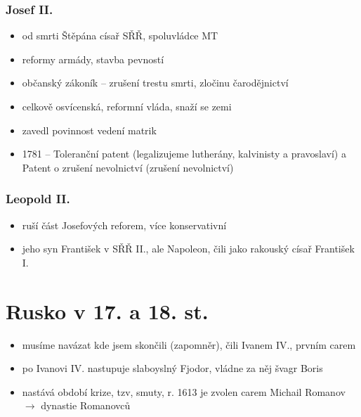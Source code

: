 \documentclass{article}
\begin{document}
\section{Josef II.}
\begin{itemize}
  \item od smrti Štěpána císař SŘŘ, spoluvládce MT
  \item reformy armády, stavba pevností
  \item občanský zákoník -- zrušení trestu smrti, zločinu čarodějnictví
  \item celkově osvícenská, reformní vláda, snaží se zemi 
  \item zavedl povinnost vedení matrik
  \item 1781 -- Toleranční patent (legalizujeme lutherány, kalvinisty a pravoslaví) a Patent o zrušení nevolnictví (zrušení nevolnictví)
\end{itemize}

\section{Leopold II.}
\begin{itemize}
  \item ruší část Josefových reforem, více konservativní
  \item jeho syn František v SŘŘ II., ale Napoleon, čili jako rakouský císař František I.
\end{itemize}

\part{Rusko v 17. a 18. st.}
\begin{itemize}
  \item musíme navázat kde jsem skončili (zapomněr), čili Ivanem IV., prvním carem
  \item po Ivanovi IV. nastupuje slaboyslný Fjodor, vládne za něj švagr Boris
  \item nastává období krize, tzv, smuty, r. 1613 je zvolen carem Michail Romanov $\rightarrow$ dynastie Romanovců
\end{itemize}
\end{document}

